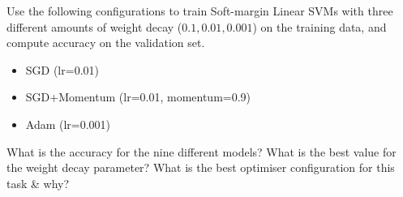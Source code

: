 \documentclass[a4paper]{article}
\begin{document}
\begin{tcolorbox}[title=2.1 Iris SVM (2 marks)]
Use the following configurations to train Soft-margin Linear SVMs with three different amounts of weight decay (${0.1,  0.01, 0.001}$) on the training data, and compute accuracy on the validation set. 
\begin{itemize}
	\item SGD (lr=0.01)
	\item SGD+Momentum (lr=0.01, momentum=0.9)
	\item Adam (lr=0.001)
\end{itemize}
What is the accuracy for the nine different models? What is the best value for the weight decay parameter? What is the best optimiser configuration for this task \& why?
\end{tcolorbox}
\end{document}

